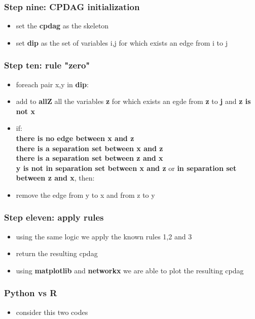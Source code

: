 \documentclass[xcolor ={table,usenames,dvipsnames}]{beamer}
\theoremstyle{definition}
\begin{document}
\begin{frame}
\frametitle{Step nine: CPDAG initialization}
\begin{itemize}
	\item set the \textbf{cpdag} as the skeleton
	\item set \textbf{dip} as the set of variables i,j for which exists an edge from i to j
\end{itemize}
\end{frame}
\begin{frame}
\frametitle{Step ten: rule "zero"}
\begin{itemize}
	\item foreach pair x,y in \textbf{dip}:
	\item add to \textbf{allZ} all the variables \textbf{z} for which exists an egde from \textbf{z} to \textbf{j} and \textbf{z is not x}
	\item if:\\\textbf{there is no edge between x and z}\\ \textbf{there is a separation set between x and z}\\\textbf{there is a separation set between z and x}\\\textbf{y is not in separation set between x and z} or \textbf{in separation set between z and x}, then:
	\item remove the edge from y to x and from z to y
\end{itemize}
\end{frame}
\begin{frame}
\frametitle{Step eleven: apply rules}
\begin{itemize}
	\item using the same logic we apply the known rules 1,2 and 3
	\item return the resulting cpdag
	\item using \textbf{matplotlib} and \textbf{networkx} we are able to plot the resulting cpdag
\end{itemize}
\end{frame}

\begin{frame}
\frametitle{Python vs R}
\begin{itemize}
	\item consider this two codes
\end{itemize}
\end{frame}
	
\end{document}
